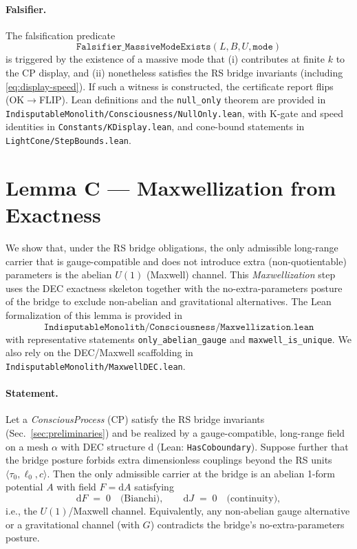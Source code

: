 \documentclass[12pt,a4paper]{article}
\begin{document}
\paragraph{Falsifier.}
The falsification predicate
\[
  \texttt{Falsifier\_MassiveModeExists}(L,B,U, \texttt{mode})
\]
is triggered by the existence of a massive mode that (i) contributes at finite \(k\) to the CP display, and (ii) nonetheless satisfies the RS bridge invariants (including \eqref{eq:display-speed}). If such a witness is constructed, the certificate report flips (OK\(\to\)FLIP). Lean definitions and the \texttt{null\_only} theorem are provided in \texttt{IndisputableMonolith/Consciousness/NullOnly.lean}, with K-gate and speed identities in \texttt{Constants/KDisplay.lean}, and cone-bound statements in \texttt{LightCone/StepBounds.lean}.

\section{Lemma C — Maxwellization from Exactness}
\label{sec:lemmaC}

We show that, under the RS bridge obligations, the only admissible long-range carrier that is gauge-compatible and does not introduce extra (non-quotientable) parameters is the abelian \(U(1)\) (Maxwell) channel. This \emph{Maxwellization} step uses the DEC exactness skeleton together with the no-extra-parameters posture of the bridge to exclude non-abelian and gravitational alternatives. The Lean formalization of this lemma is provided in
\[
  \texttt{IndisputableMonolith/Consciousness/Maxwellization.lean}
\]
with representative statements \texttt{only\_abelian\_gauge} and \texttt{maxwell\_is\_unique}. We also rely on the DEC/Maxwell scaffolding in \texttt{IndisputableMonolith/MaxwellDEC.lean}.

\paragraph{Statement.}
Let a \emph{ConsciousProcess} (CP) satisfy the RS bridge invariants (Sec.~\ref{sec:preliminaries}) and be realized by a gauge-compatible, long-range field on a mesh \(\alpha\) with DEC structure \(\mathrm{d}\) (Lean: \texttt{HasCoboundary}). Suppose further that the bridge posture forbids extra dimensionless couplings beyond the RS units \(\langle\tau_0,\ell_0,c\rangle\). Then the only admissible carrier at the bridge is an abelian 1-form potential \(A\) with field \(F=\mathrm{d}A\) satisfying
\begin{equation}
  \mathrm{d}F \;=\; 0
  \quad\text{(Bianchi)}, 
  \qquad
  \mathrm{d}J \;=\; 0
  \quad\text{(continuity)},
\end{equation}
i.e., the \(U(1)\)/Maxwell channel. Equivalently, any non-abelian gauge alternative or a gravitational channel (with \(G\)) contradicts the bridge’s no-extra-parameters posture.
\end{document}

